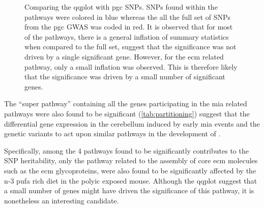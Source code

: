 \documentclass[12pt]{scrbook}
\newcommand*{\glng}{\glsentrylong}
\begin{document}
\begin{figure}
{		
		\label{fig:calcium}
	}
	\caption[Comparing the QQ plots with PGC SNPs]
	{Comparing the \gls{qqplot} with \gls{pgc} \glspl{SNP}.
		\glspl{SNP} found within the pathways were colored in blue whereas the all the full set of \glspl{SNP} from the \gls{pgc} \gls{GWAS} was coded in red.
		It is observed that for most of the pathways, there is a general inflation of summary statistics when compared to the full set, suggest that the significance was not driven by a single significant gene.
		However, for the \gls{ecm} related pathway, only a small inflation was observed. 
		This is therefore likely that the significance was driven by a small number of significant genes. 
	} 
	\label{fig:qqAll}
\end{figure}

The ``super pathway'' containing all the genes participating in the \gls{mia} related pathways were also found to be significant (\cref{tab:partitioning}) suggest that the differential gene expression in the cerebellum induced by early \gls{mia} events and the genetic variants to act upon similar pathways in the development of \glng{scz}.

Specifically, among the 4 pathways found to be significantly contributes to the \gls{SNP} heritability, only the pathway related to the assembly of core \gls{ecm} molecules such as the \gls{ecm} glycoproteins, were also found to be significantly affected by the n-3 \gls{pufa} rich diet in the \gls{polyic} exposed mouse. 
Although the \gls{qqplot} suggest that a small number of genes might have driven the significance of this pathway, it is nonetheless an interesting candidate.
\end{document}
